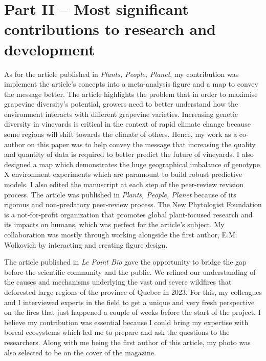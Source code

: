 \documentclass{article}
\begin{document}
\section*{Part II – Most significant contributions to research and development}
As for the article published in \textit{Plants, People, Planet}, my contribution was implement the article's concepts into a meta-analysis figure and a map to convey the message better. The article highlights the problem that in order to maximise grapevine diversity's potential, growers need to better understand how the environment interacts with different grapevine varieties. Increasing genetic diversity in vineyards is critical in the context of rapid climate change because some regions will shift towards the climate of others. Hence, my work as a co-author on this paper was to help convey the message that increasing the quality and quantity of data is required to better predict the future of vineyards. I also designed a map which demonstrates the huge geographical imbalance of genotype X environment experiments which are paramount to build robust predictive models. I also edited the manuscript at each step of the peer-review revision process. The article was published in \textit{Plants, People, Planet} because of its rigorous and non-predatory peer-review process. The New Phytologist Foundation is a not-for-profit organization that promotes global plant-focused research and its impacts on humans, which was perfect for the article's subject. My collaboration was mostly through working alongside the first author, E.M. Wolkovich by interacting and creating figure design. 

The article published in \textit{Le Point Bio} gave the opportunity to bridge the gap before the scientific community and the public. We refined our understanding of the causes and mechanisms underlying the vast and severe wildfires that deforested large regions of the province of Quebec in 2023. For this, my colleagues and I interviewed experts in the field to get a unique and very fresh perspective on the fires that just happened a couple of weeks before the start of the project. I believe my contribution was essential because I could bring my expertise with boreal ecosystems which led me to prepare and ask the questions to the researchers. Along with me being the first author of this article, my photo was also selected to be on the cover of the magazine. \\
\end{document}
